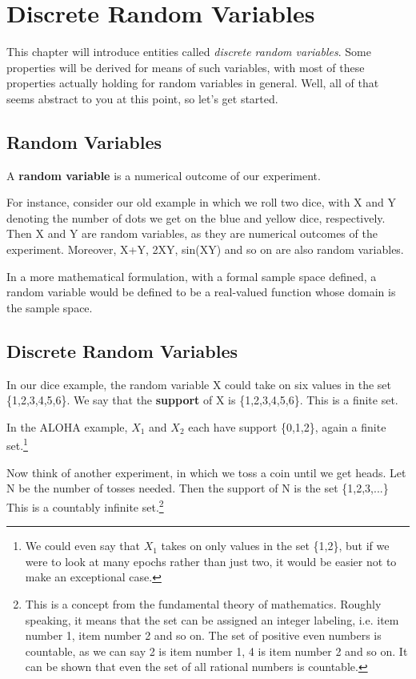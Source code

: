 \chapter{Discrete Random Variables}
\label{dis}

This chapter will introduce entities called {\it discrete random
variables}.  Some properties will be derived for means of such
variables, with most of these properties actually holding for random
variables in general.  Well, all of that seems abstract to you at this
point, so let's get started.

\section{Random Variables}

\begin{definition}
A {\bf random variable} is a numerical outcome of our experiment.
\end{definition}

For instance, consider our old example in which we roll two dice, with X
and Y denoting the number of dots we get on the blue and yellow dice,
respectively.  Then X and Y are random variables, as they are numerical
outcomes of the experiment.  Moreover, X+Y, 2XY, sin(XY) and so on are
also random variables.

In a more mathematical formulation, with a formal sample space defined,
a random variable would be defined to be a real-valued function whose
domain is the sample space.

\section{Discrete Random Variables}
\label{support}

In our dice example, the random variable X could take on six values
in the set \{1,2,3,4,5,6\}.  We say that the {\bf support} of X is 
\{1,2,3,4,5,6\}.  This is a finite set.  

In the ALOHA example, $X_1$ and $X_2$ each have support \{0,1,2\}, again
a finite set.\footnote{We could even say that $X_1$ takes on only values
in the set \{1,2\}, but if we were to look at many epochs rather than
just two, it would be easier not to make an exceptional case.}

Now think of another experiment, in which we toss a coin until we get
heads.  Let N be the number of tosses needed.  Then the support of N is
the set \{1,2,3,...\}  This is a countably infinite set.\footnote{This
is a concept from the fundamental theory of mathematics.  Roughly
speaking, it means that the set can be assigned an integer labeling,
i.e. item number 1, item number 2 and so on.  The set of positive even
numbers is countable, as we can say 2 is item number 1, 4 is item number
2 and so on.  It can be shown that even the set of all rational numbers
is countable.}

